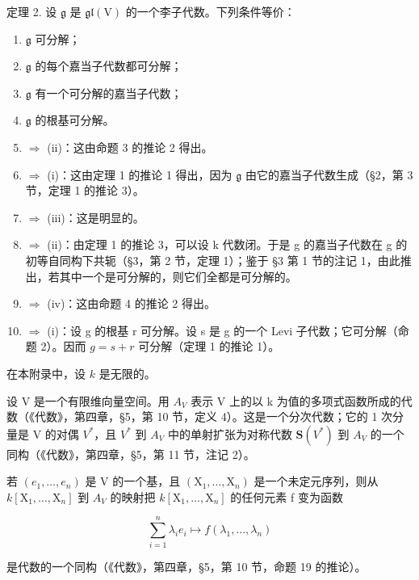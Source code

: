 定理 2. 设 \(\mathfrak{g}\) 是 \(\mathfrak{gl}(\mathrm{V})\) 的一个李子代数。下列条件等价：

\begin{enumerate}
\def\labelenumi{(\roman{enumi})}
\item
  \(\mathfrak{g}\) 可分解；
\item
  \(\mathfrak{g}\) 的每个嘉当子代数都可分解；
\item
  \(\mathfrak{g}\) 有一个可分解的嘉当子代数；
\item
  \(\mathfrak{g}\) 的根基可分解。
\item
  \(\Longrightarrow\) (ii)：这由命题 3 的推论 2 得出。
\item
  \(\Longrightarrow\) (i)：这由定理 1 的推论 1 得出，因为 \(\mathfrak{g}\) 由它的嘉当子代数生成（§2，第 3 节，定理 1 的推论 3）。
\item
  \(\Longrightarrow\) (iii)：这是明显的。
\item
  \(\Longrightarrow\) (ii)：由定理 1 的推论 3，可以设 k 代数闭。于是 g 的嘉当子代数在 g 的初等自同构下共轭（§3，第 2 节，定理 1）；鉴于 §3 第 1 节的注记 1，由此推出，若其中一个是可分解的，则它们全都是可分解的。
\item
  \(\Longrightarrow\) (iv)：这由命题 4 的推论 2 得出。
\item
  \(\Longrightarrow\) (i)：设 g 的根基 r 可分解。设 s 是 g 的一个 Levi 子代数；它可分解（命题 2）。因而 \(g = s + r\) 可分解（定理 1 的推论 1）。
\end{enumerate}


在本附录中，设 \(k\) 是无限的。


设 V 是一个有限维向量空间。用 \(A_{V}\) 表示 V 上的以 k 为值的多项式函数所成的代数（《代数》，第四章，§5，第 10 节，定义 4）。这是一个分次代数；它的 1 次分量是 V 的对偶 \(V^{*}\)，且 \(V^{*}\) 到 \(A_{V}\) 中的单射扩张为对称代数 \(\mathbf{S}(V^{*})\) 到 \(A_{V}\) 的一个同构（《代数》，第四章，§5，第 11 节，注记 2）。

若 \((e_{1},\ldots,e_{n})\) 是 V 的一个基，且 \((\mathrm{X}_{1},\ldots,\mathrm{X}_{n})\) 是一个未定元序列，则从 \(k[\mathrm{X}_{1},\ldots,\mathrm{X}_{n}]\) 到 \(A_{V}\) 的映射把 \(k[\mathrm{X}_{1},\ldots,\mathrm{X}_{n}]\) 的任何元素 f 变为函数

\[
\sum_ {i = 1} ^ {n} \lambda_ {i} e _ {i} \mapsto f (\lambda_ {1}, \ldots , \lambda_ {n})
\]

是代数的一个同构（《代数》，第四章，§5，第 10 节，命题 19 的推论）。


